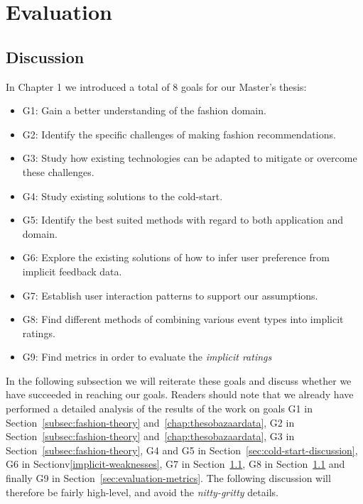 
\chapter{Evaluation}
\label{chap:resulteval}
\minitoc


\clearpage




\section{Discussion}

In Chapter 1 we introduced a total of 8 goals for our Master's thesis:

\begin{itemize}
\item G1: Gain a better understanding of the fashion domain.
\item G2: Identify the specific challenges of making fashion recommendations.
\item G3: Study how existing technologies can be adapted to mitigate or
  		  overcome these challenges.
\item G4: Study existing solutions to the cold-start.
\item G5: Identify the best suited methods with regard to both application and domain.
\item G6: Explore the existing solutions of how to infer user preference from implicit feedback data.
\item G7: Establish user interaction patterns to support our assumptions.
\item G8: Find different methods of combining various event types into implicit ratings.
\item G9: Find metrics in order to evaluate the \emph{implicit ratings}
\end{itemize}

In the following subsection we will reiterate these goals and discuss whether we have succeeded in reaching our goals. Readers should
note that we already have performed a detailed analysis of the results of the work on goals G1 in Section~\ref{subsec:fashion-theory} and~\ref{chap:thesobazaardata},
G2 in Section~\ref{subsec:fashion-theory} and~\ref{chap:thesobazaardata}, G3 in Section~\ref{subsec:fashion-theory}, G4 and G5 in Section~\ref{sec:cold-start-discussion}, G6 in Sectionv\ref{implicit-weaknesses},
G7 in Section~\ref{}, G8 in Section~\ref{} and finally G9 in Section~\ref{sec:evaluation-metrics}.
The following discussion will therefore be fairly high-level, and avoid the \emph{nitty-gritty} details.

